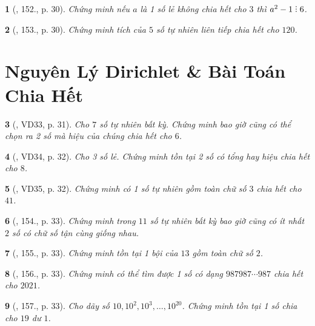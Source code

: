 \documentclass{article}
\newtheorem{baitoan}{}
\DeclareRobustCommand{\divby}{%
	\mathrel{\vbox{\baselineskip.65ex\lineskiplimit0pt\hbox{.}\hbox{.}\hbox{.}}}%
}
\begin{document}
\begin{baitoan}[\cite{Tuyen_Toan_6}, 152., p. 30]
	Chứng minh nếu $a$ là 1 số lẻ không chia hết cho $3$ thì $a^2 - 1\divby6$.
\end{baitoan}

\begin{baitoan}[\cite{Tuyen_Toan_6}, 153., p. 30]
	Chứng minh tích của $5$ số tự nhiên liên tiếp chia hết cho $120$.
\end{baitoan}


\section{Nguyên Lý Dirichlet \& Bài Toán Chia Hết}

\begin{baitoan}[\cite{Tuyen_Toan_6}, VD33, p. 31]
	Cho $7$ số tự nhiên bất kỳ. Chứng minh bao giờ cũng có thể chọn ra 2 số mà hiệu của chúng chia hết cho $6$.
\end{baitoan}

\begin{baitoan}[\cite{Tuyen_Toan_6}, VD34, p. 32]
	Cho 3 số lẻ. Chứng minh tồn tại 2 số có tổng hay hiệu chia hết cho $8$.
\end{baitoan}

\begin{baitoan}[\cite{Tuyen_Toan_6}, VD35, p. 32]
	Chứng minh có 1 số tự nhiên gồm toàn chữ số $3$ chia hết cho $41$.
\end{baitoan}

\begin{baitoan}[\cite{Tuyen_Toan_6}, 154., p. 33]
	Chứng minh trong $11$ số tự nhiên bất kỳ bao giờ cũng có ít nhất $2$ số có chữ số tận cùng giống nhau.
\end{baitoan}

\begin{baitoan}[\cite{Tuyen_Toan_6}, 155., p. 33]
	Chứng minh tồn tại 1 bội của $13$ gồm toàn chữ số $2$.
\end{baitoan}

\begin{baitoan}[\cite{Tuyen_Toan_6}, 156., p. 33]
	Chứng minh có thể tìm được 1 số có dạng $987987\cdots987$ chia hết cho $2021$.
\end{baitoan}

\begin{baitoan}[\cite{Tuyen_Toan_6}, 157., p. 33]
	Cho dãy số $10,10^2,10^3,\ldots,10^{20}$. Chứng minh tồn tại 1 số chia cho $19$ dư $1$.
\end{baitoan}
\end{document}
